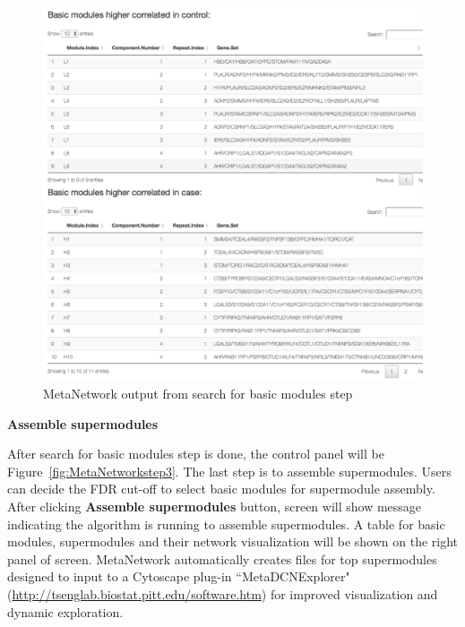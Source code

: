 \begin{steps}
\begin{figure}[H]
\begin{center}
\includegraphics[scale=0.9]{./figure/MetaNetwork/MetaNetworkBM}
\caption{MetaNetwork output from search for basic modules step}
\label{fig:MetaNetworkBM}
\end{center}
\end{figure}

\item \textbf{Assemble supermodules}

After search for basic modules step is done, the control panel will be Figure~\ref{fig:MetaNetworkstep3}. The last step is to assemble supermodules. Users can decide the FDR cut-off to select basic modules for supermodule assembly. 
After clicking \textbf{Assemble supermodules} button, screen will show message indicating the algorithm is running to assemble supermodules.
A table for basic modules, supermodules and their network visualization will be shown on the right panel of screen.
MetaNetwork automatically creates files for top supermodules designed to input to a Cytoscape plug-in ``MetaDCNExplorer"
(\url{http://tsenglab.biostat.pitt.edu/software.htm}) for improved visualization and dynamic exploration.


\end{steps}
